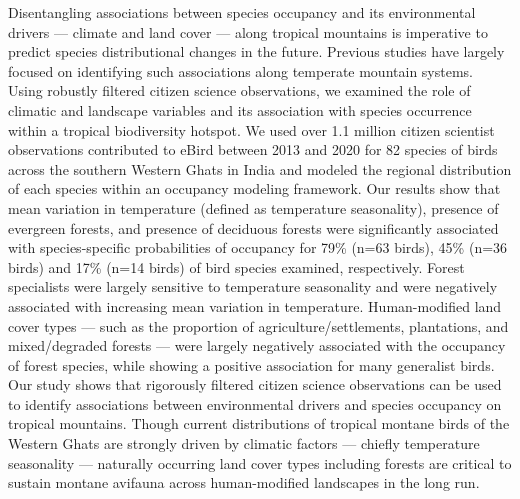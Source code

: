 \small{
    Disentangling associations between species occupancy and its environmental drivers --- climate and land cover --- along tropical mountains is imperative to predict species distributional changes in the future. 
    Previous studies have largely focused on identifying such associations along temperate mountain systems. 
    Using robustly filtered citizen science observations, we examined the role of climatic and landscape variables and its association with species occurrence within a tropical biodiversity hotspot. 
    We used over 1.1 million citizen scientist observations contributed to eBird between 2013 and 2020 for 82 species of birds across the southern Western Ghats in India and modeled the regional distribution of each species within an occupancy modeling framework. 
    Our results show that mean variation in temperature (defined as temperature seasonality), presence of evergreen forests, and presence of deciduous forests were significantly associated with species-specific probabilities of occupancy for 79\% (n=63 birds), 45\% (n=36 birds) and 17\% (n=14 birds) of bird species examined, respectively. 
    Forest specialists were largely sensitive to temperature seasonality and were negatively associated with increasing mean variation in temperature. 
    Human-modified land cover types --- such as the proportion of agriculture/settlements, plantations, and mixed/degraded forests --- were largely negatively associated with the occupancy of forest species, while showing a positive association for many generalist birds. 
    Our study shows that rigorously filtered citizen science observations can be used to identify associations between environmental drivers and species occupancy on tropical mountains. 
    Though current distributions of tropical montane birds of the Western Ghats are strongly driven by climatic factors --- chiefly temperature seasonality --- naturally occurring land cover types including forests are critical to sustain montane avifauna across human-modified landscapes in the long run.
}

\clearpage

